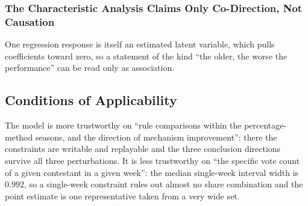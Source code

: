 %

\subsubsection{The Characteristic Analysis Claims Only Co-Direction, Not Causation}
One regression response is itself an estimated latent variable, which pulls coefficients toward zero, so a statement of the kind ``the older, the worse the performance'' can be read only as association.

\subsection{Conditions of Applicability}

The model is more trustworthy on ``rule comparisons within the percentage-method seasons, and the direction of mechanism improvement'': there the constraints are writable and replayable and the three conclusion directions survive all three perturbations. It is less trustworthy on ``the specific vote count of a given contestant in a given week'': the median single-week interval width is $0.992$, so a single-week constraint rules out almost no share combination and the point estimate is one representative taken from a very wide set.
